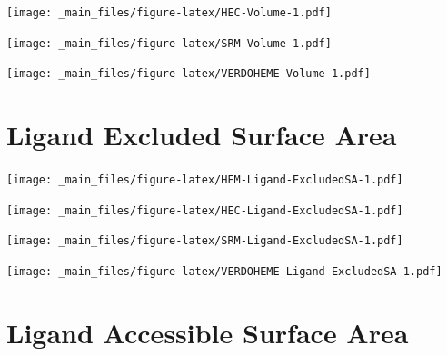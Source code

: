 \documentclass[a4paper, nobind]{templates/ociamthesis}
\let\origfigure\figure
\let\endorigfigure\endfigure
\renewenvironment{figure}[1][2] {
    \expandafter\origfigure\expandafter[H]
} {
    \endorigfigure
}
\begin{document}
\begin{figure}
\centering
\texttt{[image: \_main\_files/figure-latex/HEC-Volume-1.pdf]}
\caption{\label{fig:HEC-Volume}HEC: Volume}
\end{figure}

\begin{figure}
\centering
\texttt{[image: \_main\_files/figure-latex/SRM-Volume-1.pdf]}
\caption{\label{fig:SRM-Volume}SRM: Volume}
\end{figure}

\begin{figure}
\centering
\texttt{[image: \_main\_files/figure-latex/VERDOHEME-Volume-1.pdf]}
\caption{\label{fig:VERDOHEME-Volume}VERDOHEME: Volume}
\end{figure}

\hypertarget{figs-ligExcSA}{%
\section{Ligand Excluded Surface Area}\label{figs-ligExcSA}}

\begin{figure}
\centering
\texttt{[image: \_main\_files/figure-latex/HEM-Ligand-ExcludedSA-1.pdf]}
\caption{\label{fig:HEM-Ligand-ExcludedSA}HEM: Ligand Excluded Suface Area}
\end{figure}

\begin{figure}
\centering
\texttt{[image: \_main\_files/figure-latex/HEC-Ligand-ExcludedSA-1.pdf]}
\caption{\label{fig:HEC-Ligand-ExcludedSA}HEC: Ligand Excluded Suface Area}
\end{figure}

\begin{figure}
\centering
\texttt{[image: \_main\_files/figure-latex/SRM-Ligand-ExcludedSA-1.pdf]}
\caption{\label{fig:SRM-Ligand-ExcludedSA}SRM: Ligand Excluded Suface Area}
\end{figure}

\begin{figure}
\centering
\texttt{[image: \_main\_files/figure-latex/VERDOHEME-Ligand-ExcludedSA-1.pdf]}
\caption{\label{fig:VERDOHEME-Ligand-ExcludedSA}VERDOHEME: Ligand Excluded Suface Area}
\end{figure}

\hypertarget{figs-ligAccSA}{%
\section{Ligand Accessible Surface Area}\label{figs-ligAccSA}}
\end{document}
